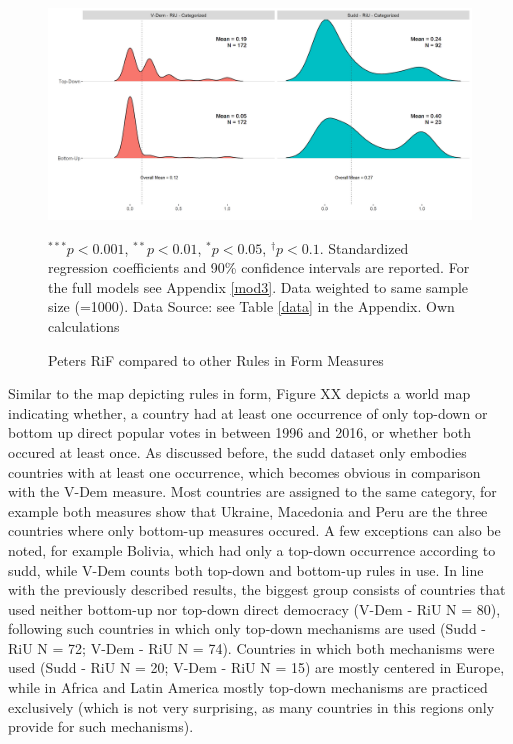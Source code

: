 \documentclass{systats}
\begin{document}
\begin{figure}
	\caption{Peters RiF compared to other Rules in Form Measures}
	\label{reg2}
	\includegraphics[width=\textwidth]{images/type_riu.png}
	\flushright
	{\scriptsize $^{***}p<0.001$, $^{**}p<0.01$, $^*p<0.05$, $^{\dagger}p<0.1$. Standardized regression coefficients and 90\% confidence intervals are reported. For the full models see Appendix \ref{mod3}. Data weighted to same sample size (=1000). Data Source: see Table \ref{data} in the Appendix. Own calculations  \par}
\end{figure}


Similar to the map depicting rules in form, Figure XX depicts a world map indicating whether, a country had at least one occurrence of only top-down or bottom up direct popular votes in between 1996 and 2016, or whether both occured at least once. As discussed before, the sudd dataset only embodies countries with at least one occurrence, which becomes obvious in comparison with the V-Dem measure. Most countries are assigned to the same category, for example both measures show that Ukraine, Macedonia and Peru are the three countries where only bottom-up measures occured. A  few exceptions can also be noted, for example Bolivia, which had only a top-down occurrence according to sudd, while V-Dem counts both top-down and bottom-up rules in use. In line with the previously described results, the biggest group consists of countries that used neither bottom-up nor top-down direct democracy (V-Dem - RiU N = 80), following such countries in which only top-down mechanisms are used (Sudd - RiU N = 72; V-Dem - RiU N = 74). Countries in which both mechanisms were used (Sudd - RiU N = 20; V-Dem - RiU N = 15) are mostly centered in Europe, while in Africa and Latin America mostly top-down mechanisms are practiced exclusively (which is not very surprising, as many countries in this regions only provide for such mechanisms).
\end{document}
